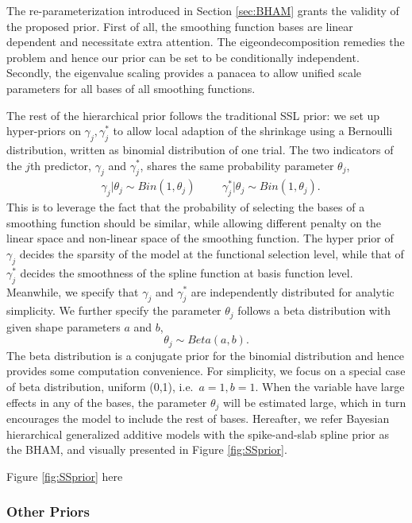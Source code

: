 \documentclass[AMA,STIX1COL,]{WileyNJD-v2}
\begin{document}
The re-parameterization introduced in Section \ref{sec:BHAM} grants the
validity of the proposed prior. First of all, the smoothing function
bases are linear dependent and necessitate extra attention. The
eigeondecomposition remedies the problem and hence our prior can be set
to be conditionally independent. Secondly, the eigenvalue scaling
provides a panacea to allow unified scale parameters for all bases of
all smoothing functions.

The rest of the hierarchical prior follows the traditional SSL prior: we
set up hyper-priors on \(\gamma_j, \gamma^*_j\) to allow local adaption
of the shrinkage using a Bernoulli distribution, written as binomial
distribution of one trial. The two indicators of the \(j\)th predictor,
\(\gamma_j\) and \(\gamma^*_j\), shares the same probability parameter
\(\theta_j\), \[
\begin{aligned}
&\gamma_{j} | \theta_j \sim Bin(1, \theta_j) & & 
&\gamma_{j}^*| \theta_j \sim Bin(1, \theta_j).
\end{aligned}
\] This is to leverage the fact that the probability of selecting the
bases of a smoothing function should be similar, while allowing
different penalty on the linear space and non-linear space of the
smoothing function. The hyper prior of \(\gamma_{j}\) decides the
sparsity of the model at the functional selection level, while that of
\(\gamma_{j}^*\) decides the smoothness of the spline function at basis
function level. Meanwhile, we specify that \(\gamma_{j}\) and
\(\gamma_{j}^*\) are independently distributed for analytic simplicity.
We further specify the parameter \(\theta_j\) follows a beta
distribution with given shape parameters \(a\) and \(b\), \[
\theta_j \sim Beta(a, b).
\] The beta distribution is a conjugate prior for the binomial
distribution and hence provides some computation convenience. For
simplicity, we focus on a special case of beta distribution, uniform
(0,1), i.e.~\(a = 1, b = 1\). When the variable have large effects in
any of the bases, the parameter \(\theta_j\) will be estimated large,
which in turn encourages the model to include the rest of bases.
Hereafter, we refer Bayesian hierarchical generalized additive models
with the spike-and-slab spline prior as the BHAM, and visually presented
in Figure \ref{fig:SSprior}.

\begin{center}
Figure \ref{fig:SSprior} here
\end{center}

\hypertarget{other-priors}{%
\subsubsection{Other Priors}\label{other-priors}}
\end{document}

